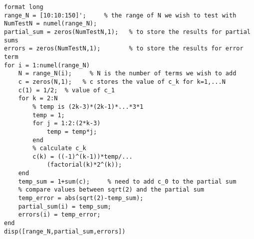 \lstset{basicstyle=\footnotesize,style=myCustomMatlabStyle}
\begin{lstlisting}
format long
range_N = [10:10:150]';     % the range of N we wish to test with
NumTestN = numel(range_N);
partial_sum = zeros(NumTestN,1);   % to store the results for partial sums
errors = zeros(NumTestN,1);        % to store the results for error term
for i = 1:numel(range_N)
    N = range_N(i);     % N is the number of terms we wish to add
    c = zeros(N,1);   % c stores the value of c_k for k=1,...N
    c(1) = 1/2;  % value of c_1
    for k = 2:N
        % temp is (2k-3)*(2k-1)*...*3*1
        temp = 1;
        for j = 1:2:(2*k-3)
            temp = temp*j;
        end
        % calculate c_k
        c(k) = ((-1)^(k-1))*temp/...
            (factorial(k)*2^(k));
    end
    temp_sum = 1+sum(c);     % need to add c_0 to the partial sum  
    % compare values between sqrt(2) and the partial sum
    temp_error = abs(sqrt(2)-temp_sum);  
    partial_sum(i) = temp_sum;
    errors(i) = temp_error;
end
disp([range_N,partial_sum,errors])


\end{lstlisting}